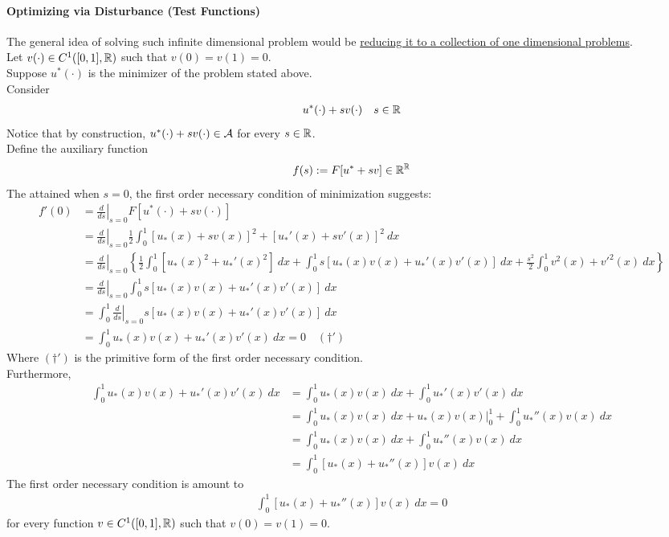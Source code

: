 \documentclass{article}
\begin{document}
	\paragraph{Optimizing via Disturbance (Test Functions)} The general idea of solving such infinite dimensional problem would be \ul{reducing it to a collection of one dimensional problems}. \\
	Let $v(\cdot) \in C^1([0, 1], \mathbb{R})$ such that $v(0) = v(1) = 0$. \\
	Suppose $u^*(\cdot)$ is the minimizer of the problem stated above. \\
	Consider
	\begin{align}
		u^*(\cdot) + s v(\cdot)\quad s \in \mathbb{R}
	\end{align}
	Notice that by construction, $u^*(\cdot) + s v(\cdot) \in \mathcal{{A}}$ for every $s \in \mathbb{R}$. \\
	Define the auxiliary function 
	\begin{align}
		f(s) := F[u^* + sv] \in \mathbb{R}^{\mathbb{R}}
	\end{align}
	The attained when $s=0$, the first order necessary condition of minimization suggests:
	\begin{align}
		f'(0) &= \left. \frac{d}{ds} \right|_{s=0} F[u^*(\cdot) + sv(\cdot)] \\
		&= \left. \frac{d}{ds} \right|_{s=0} \frac{1}{2}
		\int_0^1 \left[u_*(x) + sv(x) \right]^2 + \left[u_*'(x) + sv'(x) \right]^2\ dx \\
		&= \left. \frac{d}{ds} \right|_{s=0} \left \{
		\frac{1}{2} \int_0^1 [u_*(x)^2 + u_*'(x)^2]\ dx
		+ \int_0^1 s[u_*(x) v(x) + u_*'(x) v'(x)]\ dx 
		+ \frac{s^2}{2} \int_0^1 v^2(x) + v'^2(x)\ dx
		\right \} \\
		&= \left. \frac{d}{ds} \right|_{s=0} \int_0^1 s[u_*(x) v(x) + u_*'(x) v'(x)]\ dx \\
		&= \int_0^1\left. \frac{d}{ds} \right|_{s=0} s[u_*(x) v(x) + u_*'(x) v'(x)]\ dx \\
		&= \int_0^1 u_*(x) v(x) + u_*'(x) v'(x)\ dx = 0\quad (\dagger')
	\end{align}
	Where $(\dagger')$ is the primitive form of the first order necessary condition. \\
	Furthermore,
	\begin{align}
		\int_0^1 u_*(x) v(x) + u_*'(x) v'(x)\ dx
		&= \int_0^1 u_*(x) v(x)\ dx + \int_0^1 u_*'(x) v'(x)\ dx \\
		&= \int_0^1 u_*(x) v(x)\ dx
		+ \left. u_*(x) v(x) \right|_{0}^1
		+ \int_0^1 u_*''(x) v(x)\ dx \\
		&= \int_0^1 u_*(x) v(x)\ dx
		+ \int_0^1 u_*''(x) v(x)\ dx \\
		&= \int_0^1 [u_*(x) + u_*''(x)] v(x)\ dx
	\end{align}
	The first order necessary condition is amount to
	\begin{align}
		\int_0^1 [u_*(x) + u_*''(x)] v(x)\ dx = 0
	\end{align}
	for every function $v \in C^1([0, 1], \mathbb{R})$ such that $v(0) = v(1) = 0$.
	
\end{document}
